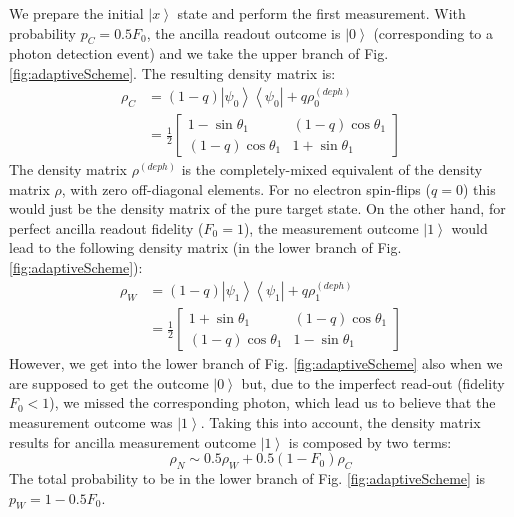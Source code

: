 \documentclass[12pt]{article}
\def\bra#1{\left<#1\right|}
\def\ket#1{\left|#1\right>}
\begin{document}
We prepare the initial $\ket{x}$ state and perform the first measurement. With probability $p_C = 0.5 F_0$, the ancilla readout outcome is $\ket{0}$ (corresponding to a photon detection event) and we take the upper branch of Fig. \ref{fig:adaptiveScheme}. The resulting density matrix is:
\begin{equation}
\begin{split}
 \rho_C &= (1-q) \ket{\psi_0}\bra{\psi_0} + q \rho_0^{(deph)}\\
 &= \frac{1}{2} \left[
\begin{array}{cc}
1-\sin\theta_1 & (1-q) \cos\theta_1\\
(1-q) \cos\theta_1 & 1+\sin \theta_1
\end{array}
\right]
\end{split}
\end{equation}
The density matrix $\rho^{(deph)}$ is the completely-mixed equivalent of the density matrix $\rho$, with zero off-diagonal elements. 
For no electron spin-flips ($q = 0$) this would just be the density matrix of the pure target state.
On the other hand, for perfect ancilla readout fidelity ($F_0=1$), the measurement outcome $\ket{1}$ would lead to the following density matrix (in the lower branch of Fig. \ref{fig:adaptiveScheme}):
\begin{equation}
\begin{split}
 \rho_W &= (1-q) \ket{\psi_1}\bra{\psi_1} + q \rho_1^{(deph)}\\
&=
\frac{1}{2}
\left[
\begin{array}{cc}
1+\sin\theta_1 & (1-q) \cos\theta_1\\
(1-q) \cos\theta_1 & 1-\sin \theta_1
\end{array}
\right]
\end{split}
\end{equation}
However, we get into the lower branch of Fig. \ref{fig:adaptiveScheme} also when we are supposed to get the outcome $\ket{0}$ but, due to the imperfect read-out (fidelity $F_0<1$), we missed the corresponding photon, which lead us to believe that the measurement outcome was $\ket{1}$. Taking this into account, the density matrix results for ancilla measurement outcome $\ket{1}$ is composed by two terms:
\begin{equation}
 \rho_N \sim 0.5 \rho_W + 0.5 (1-F_0) \rho_C
 \label{eq:rhoN}
\end{equation}
The total probability to be in the lower branch of Fig. \ref{fig:adaptiveScheme} is $p_W = 1- 0.5 F_0$.\\
\end{document}
